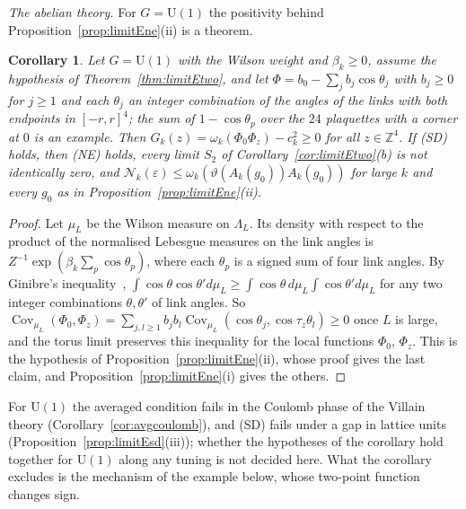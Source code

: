 \documentclass[aps,prd,twocolumn,superscriptaddress,nofootinbib,longbibliography,floatfix,amsmath,amssymb,10pt]{revtex4-2}
\newtheorem{corollary}[theorem]{Corollary}
\theoremstyle{definition}
\theoremstyle{remark}
\newcommand{\Z}{\mathbb{Z}}
\newcommand{\U}{\mathrm{U}}
\newcommand{\Cov}{\operatorname{Cov}}
\begin{document}
\emph{The abelian theory.} For $G=\U(1)$ the positivity behind
Proposition~\ref{prop:limitEne}(ii) is a theorem.

\begin{corollary}\label{cor:limitEabelian}
Let $G=\U(1)$ with the Wilson weight and $\beta_k\ge0$, assume the
hypothesis of Theorem~\textup{\ref{thm:limitEtwo}}, and let
$\Phi=b_0-\sum_jb_j\cos\theta_j$ with $b_j\ge0$ for $j\ge1$ and each
$\theta_j$ an integer combination of the angles of the links with both
endpoints in $[-r,r]^4$; the sum of $1-\cos\theta_p$ over the $24$
plaquettes with a corner at $0$ is an example. Then $G_k(z)=\omega_k(\Phi_0\Phi_z)-c_k^2\ge0$ for all
$z\in\Z^4$. If \textup{(SD)} holds, then \textup{(NE)} holds, every limit
$S_2$ of Corollary~\textup{\ref{cor:limitEtwo}(b)} is not identically zero,
and $\mathcal N_k(\varepsilon)\le\omega_k(\vartheta(A_k(g_0))A_k(g_0))$ for
large $k$ and every $g_0$ as in Proposition~\textup{\ref{prop:limitEne}(ii)}.
\end{corollary}

\begin{proof}
Let $\mu_L$ be the Wilson measure on $\Lambda_L$. Its density with respect
to the product of the normalised Lebesgue measures on the link angles is
$Z^{-1}\exp(\beta_k\sum_p\cos\theta_p)$, where each $\theta_p$ is a signed
sum of four link angles. By Ginibre's inequality~\cite{Gin70},
$\int\cos\theta\cos\theta'd\mu_L\ge\int\cos\theta\,d\mu_L\int\cos\theta'
d\mu_L$ for any two integer combinations $\theta,\theta'$ of link angles.
So $\Cov_{\mu_L}(\Phi_0,\Phi_z)=\sum_{j,l\ge1}b_jb_l\Cov_{\mu_L}(\cos
\theta_j,\cos\tau_z\theta_l)\ge0$ once $L$ is large, and the torus limit
preserves this inequality for the local functions $\Phi_0$, $\Phi_z$. This
is the hypothesis of Proposition~\ref{prop:limitEne}(ii), whose proof gives
the last claim, and Proposition~\ref{prop:limitEne}(i) gives the others.
\end{proof}

For $\U(1)$ the averaged condition fails in the Coulomb phase of the Villain
theory (Corollary~\ref{cor:avgcoulomb}), and (SD) fails under a gap in
lattice units (Proposition~\ref{prop:limitEsd}(iii)); whether the
hypotheses of the corollary hold together for $\U(1)$ along any tuning is
not decided here. What the corollary excludes is the mechanism of the
example below, whose two-point function changes sign.
\end{document}
